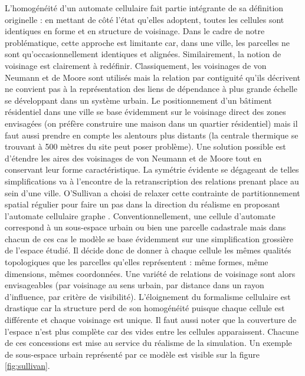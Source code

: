\documentclass[10pt]{article}
\begin{document}
L'homogénéité d'un automate cellulaire fait partie intégrante de sa
définition originelle : en mettant de côté l'état qu'elles adoptent,
toutes les cellules sont identiques en forme et en structure de
voisinage. Dans le cadre de notre problématique, cette approche est
limitante car, dans une ville, les parcelles ne sont
qu'occasionnellement identiques et alignées. Similairement, la notion
de voisinage est clairement à redéfinir. Classiquement, les voisinages
de von Neumann et de Moore sont utilisés mais la relation par
contiguité qu'ils décrivent ne convient pas à la représentation des
liens de dépendance à plus grande échelle se développant dans un
système urbain. Le positionnement d'un bâtiment résidentiel dans une
ville se base évidemment sur le voisinage direct des zones envisagées
(on préfère construire une maison dans un quartier résidentiel) mais
il faut aussi prendre en compte les alentours plus distants (la
centrale thermique se trouvant à 500 mètres du site peut poser
problème). Une solution possible est d'étendre les aires des
voisinages de von Neumann et de Moore tout en conservant leur forme
caractéristique. La symétrie évidente se dégageant de telles
simplifications va à l'encontre de la retranscription des relations
prenant place au sein d'une ville. O'Sullivan a choisi de relaxer
cette contrainte de partitionnement spatial régulier pour faire un pas
dans la direction du réalisme en proposant l'automate cellulaire
graphe \cite{O'Sullivan2000,O'Sullivan2001}. Conventionnellement, une
cellule d'automate correspond à un sous-espace urbain ou bien une
parcelle cadastrale mais dans chacun de ces cas le modèle se base
évidemment sur une simplification grossière de l'espace étudié. Il
décide donc de donner à chaque cellule les mêmes qualités topologiques
que les parcelles qu'elles représentent : même formes, même
dimensions, mêmes coordonnées. Une variété de relations de voisinage
sont alors envisageables (par voisinage au sens urbain, par distance
dans un rayon d'influence, par critère de visibilité). L'éloignement
du formalisme cellulaire est drastique car la structure perd de son
homogénéité puisque chaque cellule est différente et chaque voisinage
est unique. Il faut aussi noter que la couverture de l'espace n'est
plus complète car des vides entre les cellules apparaissent. Chacune
de ces concessions est mise au service du réalisme de la
simulation. Un exemple de sous-espace urbain représenté par ce modèle
est visible sur la figure \ref{fig:sullivan}.
\end{document}

